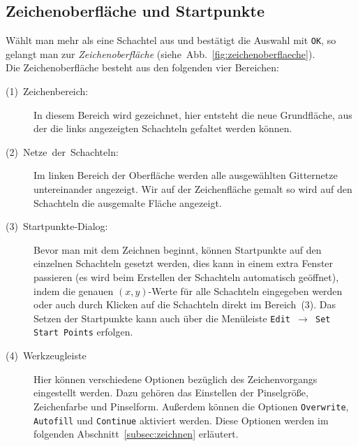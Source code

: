 \subsection{Zeichenoberfläche und Startpunkte}
\label{subsec:zeichenoberflaeche}

Wählt man mehr als eine Schachtel aus und bestätigt die Auswahl mit \texttt{OK}, so gelangt man zur \emph{Zeichenoberfläche} (siehe~Abb.~\ref{fig:zeichenoberflaeche}).\\

Die Zeichenoberfläche besteht aus den folgenden vier Bereichen:

  \begin{description}
    \item [{(1)~Zeichenbereich:}] In diesem Bereich wird gezeichnet, hier entsteht die neue Grundfläche, aus der die links angezeigten Schachteln gefaltet werden können.
    \item [(2)~Netze~der~Schachteln:] Im linken Bereich der Oberfläche werden alle ausgewählten Gitternetze untereinander angezeigt. Wir auf der Zeichenfläche gemalt so wird auf den Schachteln die ausgemalte Fläche angezeigt.
    \item [(3)~Startpunkte-Dialog:] Bevor man mit dem Zeichnen beginnt, können Startpunkte auf den einzelnen Schachteln gesetzt werden, dies kann in einem extra Fenster passieren (es wird beim Erstellen der Schachteln automatisch geöffnet), indem die genauen $(x,y)$-Werte für alle Schachteln eingegeben werden oder auch durch Klicken auf die Schachteln direkt im Bereich~(3). Das Setzen der Startpunkte kann auch über die Menüleiste \texttt{Edit $\rightarrow$ Set Start Points} erfolgen.
    \item [(4)~Werkzeugleiste] Hier können verschiedene Optionen bezüglich des Zeichenvorgangs eingestellt werden. Dazu gehören das Einstellen der Pinselgröße, Zeichenfarbe und Pinselform. Außerdem können die Optionen \texttt{Overwrite}, \texttt{Autofill} und \texttt{Continue} aktiviert werden. Diese Optionen werden im folgenden Abschnitt~\ref{subsec:zeichnen} erläutert.
  \end{description}

